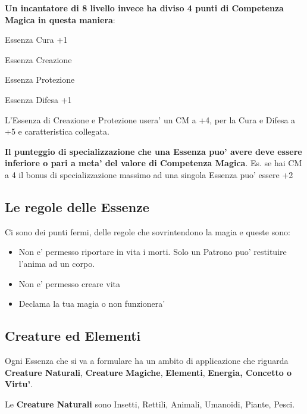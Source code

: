 \documentclass[a4paper,11pt,twoside,openany]{dndbook}
\begin{document}
\bigskip

\textbf{Un incantatore di 8 livello invece ha diviso 4 punti di Competenza
Magica in questa maniera}:

Essenza Cura +1

Essenza Creazione

Essenza Protezione

Essenza Difesa +1

L'Essenza di Creazione e Protezione usera' un CM a +4, per la Cura e Difesa a +5 e caratteristica collegata.

\bigskip

\textbf{Il punteggio di specializzazione che una Essenza puo' avere deve essere inferiore o pari a meta' del valore di Competenza Magica}. Es. se hai CM a 4 il bonus di specializzazione massimo ad una singola Essenza puo' essere +2

\subsection{Le regole delle Essenze}

\label{le-regole-delle-essenze}

Ci sono dei punti fermi, delle regole che sovrintendono la magia e queste sono:
\begin{itemize}
\item Non e' permesso riportare in vita i morti. Solo un Patrono puo' restituire l'anima ad un corpo. 

\item Non e' permesso creare vita 

\item Declama la tua magia o non funzionera' 

\end{itemize}

\subsection{Creature ed Elementi}

\label{creature-ed-elementi}

Ogni Essenza che si va a formulare ha un ambito di applicazione che riguarda \textbf{Creature Naturali}, \textbf{Creature} \textbf{Magiche},
\textbf{Elementi}, \textbf{Energia, Concetto o Virtu'}.
\bigskip

Le \textbf{Creature Naturali} sono Insetti, Rettili, Animali, Umanoidi, Piante, Pesci.
\end{document}
